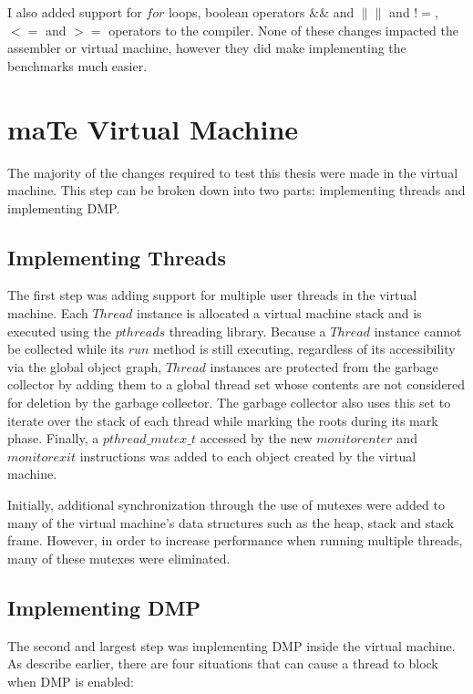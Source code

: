 I also added support for $for$ loops, boolean operators $\&\&$ and
$\|\|$ and $!=$, $<=$ and $>=$ operators to the compiler.  None of
these changes impacted the assembler or virtual machine, however they
did make implementing the benchmarks much easier.

\section{maTe Virtual Machine}

The majority of the changes required to test this thesis were made in
the virtual machine.  This step can be broken down into two parts:
implementing threads and implementing DMP.

\subsection{Implementing Threads}

The first step was adding support for multiple user threads in the
virtual machine.  Each $Thread$ instance is allocated a virtual
machine stack and is executed using the $pthreads$ threading library.
Because a $Thread$ instance cannot be collected while its $run$ method
is still executing, regardless of its accessibility via the global
object graph, $Thread$ instances are protected from the garbage
collector by adding them to a global thread set whose contents are not
considered for deletion by the garbage collector.  The garbage
collector also uses this set to iterate over the stack of each thread
while marking the roots during its mark phase.  Finally, a
$pthread\_mutex\_t$ accessed by the new $monitorenter$ and
$monitorexit$ instructions was added to each object created by the
virtual machine.

Initially, additional synchronization through the use of mutexes were
added to many of the virtual machine's data structures such as the
heap, stack and stack frame.  However, in order to increase
performance when running multiple threads, many of these mutexes were
eliminated.

\subsection{Implementing DMP}

The second and largest step was implementing DMP inside the virtual
machine.  As describe earlier, there are four situations that can
cause a thread to block when DMP is enabled:

